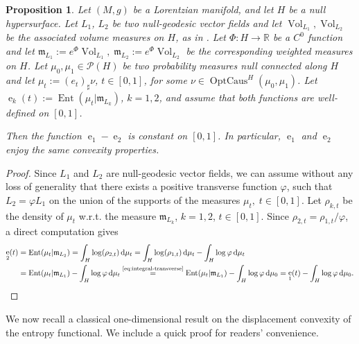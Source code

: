 \documentclass[12pt,a4paper]{amsart}
\theoremstyle{plain}
\newtheorem{proposition}[lemma]{Proposition}
\theoremstyle{definition}
\numberwithin{equation}{section}
\newcommand{\R}{\mathbb{R}}
\DeclareMathOperator{\Ent}{Ent}
\DeclareMathOperator{\OptCaus}{OptCaus}
\DeclareMathOperator{\ee}{e}
\DeclareMathOperator{\vol}{Vol}
\newcommand{\de}{{\mathrm{d}}}
\newcommand{\Prob}{\mathcal P}
\newcommand{\mm}{\mathfrak m}
\begin{document}
\begin{proposition}
    \label{P:entropy-convexity}
    Let $(M,g)$ be a Lorentzian manifold, and let $H$ be a null hypersurface.
%
  Let $L_1$, $L_2$ be two null-geodesic vector fields and let $\vol_{L_1}, \vol_{L_2}$ be the associated volume measures on $H$, as in . Let $\Phi:H\to \R$ be a $C^0$ function and let $\mm_{L_1}:=e^{\Phi}\vol_{L_1},\; \mm_{L_2}:=e^{\Phi}\vol_{L_2}$ be the corresponding weighted measures on $H$.
  Let $\mu_0,\mu_1\in \Prob(H)$ be two probability measures null connected
  along $H$ and let $\mu_t:=(e_t)_{\sharp}\nu$, $t\in [0,1]$,
  for some  $\nu\in\OptCaus^H(\mu_0, \mu_1)$.
  Let $\ee_k(t):=\Ent(\mu_t|\mm_{L_k})$, $k=1,2$, and assume that both
  functions are well-defined on $[0,1]$.

  Then the function $\ee_1-\ee_2$ is constant on $[0,1]$.
  In particular, $\ee_1$ and $\ee_2$ enjoy the same convexity
  properties.
\end{proposition}
\begin{proof}
Since $L_1$ and $L_2$ are null-geodesic vector fields, we can assume without any loss of generality that there exists
 a positive transverse function $\varphi$, such that $L_2=\varphi L_1$ on the union of the supports of the measures $\mu_{t}, \;t\in [0,1]$.
  Let $\rho_{k,t}$ be the density of $\mu_t$ w.r.t. the measure
  $\mm_{L_k}$, $k=1,2$, $t\in [0,1]$.
  Since $\rho_{2,t}=\rho_{1,t}/\varphi$, a direct
  computation gives
  \begin{align*}
    \ee_{2}(t)
    &
      =
      \Ent(\mu_t|\mm_{L_2})
    =
    \int_H
    \log(\rho_{2,t})
    \,
    \de\mu_t
    =
    \int_H
    \log(\rho_{1,t})
    \,
    \de\mu_t
    -
      \int_H
    \log \varphi
    \,
      \de\mu_t
    \\
    &
      =
      \Ent(\mu_t|\mm_{L_1})
    -
      \int_H
    \log \varphi
    \,
    \de\mu_t
      \stackrel{\text{\eqref{eq:integral-transverse}}}{=}
      \Ent(\mu_t|\mm_{L_1})
    -
      \int_H
    \log \varphi
    \,
    \de\mu_0
      =
      \ee_1(t)
    -
      \int_H
    \log \varphi
    \,
      \de\mu_0
      .
      \qedhere
  \end{align*}
\end{proof}


We now recall a classical one-dimensional result on the displacement convexity of the entropy functional.
We include a quick proof for readers' convenience. 
\end{document}
